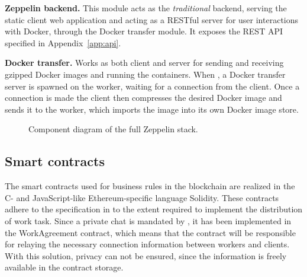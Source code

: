 \textbf{Zeppelin backend.} This module acts as the \textit{traditional} backend, serving the static client web application and acting as a RESTful server for user interactions with Docker, through the Docker transfer module. It exposes the REST API specified in Appendix~\ref{app:api}.

\textbf{Docker transfer.} Works as both client and server for sending and receiving gzipped Docker images and running the containers. When , a Docker transfer server is spawned on the worker, waiting for a connection from the client. Once a connection is made the client then compresses the desired Docker image and sends it to the worker, which imports the image into its own Docker image store.

\begin{figure}[ht]
\centering
{}
\caption{Component diagram of the full Zeppelin stack.}
\label{zep-stack}
\end{figure}

\subsection{Smart contracts}
The smart contracts used for business rules in the blockchain are realized in the C- and JavaScript-like Ethereum-specific language Solidity. These contracts adhere to the specification in  to the extent required to implement the distribution of work task. Since a private chat is mandated by , it has been implemented in the WorkAgreement contract, which means that the contract will be responsible for relaying the necessary connection information between workers and clients. With this solution, privacy can not be ensured, since the information is freely available in the contract storage.

